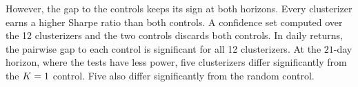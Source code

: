 However, the gap to the controls keeps its sign at both horizons. Every clusterizer earns a higher Sharpe ratio than both controls. A confidence set computed over the 12 clusterizers and the two controls discards both controls. In daily returns, the pairwise gap to each control is significant for all 12 clusterizers. At the $21$-day horizon, where the tests have less power, five clusterizers differ significantly from the $K=1$ control. Five also differ significantly from the random control.

